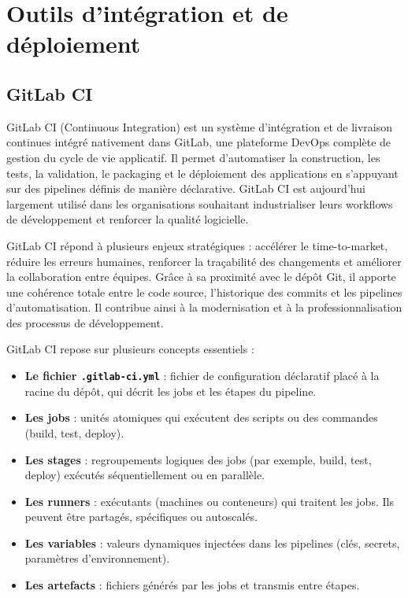\section{Outils d’intégration et de déploiement}
\subsection{GitLab CI}

GitLab CI (Continuous Integration) est un système d’intégration et de livraison continues intégré nativement dans GitLab, une plateforme DevOps complète de gestion du cycle de vie applicatif. Il permet d’automatiser la construction, les tests, la validation, le packaging et le déploiement des applications en s’appuyant sur des pipelines définis de manière déclarative. GitLab CI est aujourd’hui largement utilisé dans les organisations souhaitant industrialiser leurs workflows de développement et renforcer la qualité logicielle.

GitLab CI répond à plusieurs enjeux stratégiques  : accélérer le time-to-market, réduire les erreurs humaines, renforcer la traçabilité des changements et améliorer la collaboration entre équipes. Grâce à sa proximité avec le dépôt Git, il apporte une cohérence totale entre le code source, l’historique des commits et les pipelines d’automatisation. Il contribue ainsi à la modernisation et à la professionnalisation des processus de développement.

GitLab CI repose sur plusieurs concepts essentiels  :
\begin{itemize}
	\item \textbf{Le fichier \texttt{.gitlab-ci.yml}}  : fichier de configuration déclaratif placé à la racine du dépôt, qui décrit les jobs et les étapes du pipeline.
	\item \textbf{Les jobs}  : unités atomiques qui exécutent des scripts ou des commandes (build, test, deploy).
	\item \textbf{Les stages}  : regroupements logiques des jobs (par exemple, build, test, deploy) exécutés séquentiellement ou en parallèle.
	\item \textbf{Les runners}  : exécutants (machines ou conteneurs) qui traitent les jobs. Ils peuvent être partagés, spécifiques ou autoscalés.
	\item \textbf{Les variables}  : valeurs dynamiques injectées dans les pipelines (clés, secrets, paramètres d’environnement).
	\item \textbf{Les artefacts}  : fichiers générés par les jobs et transmis entre étapes.
\end{itemize}

